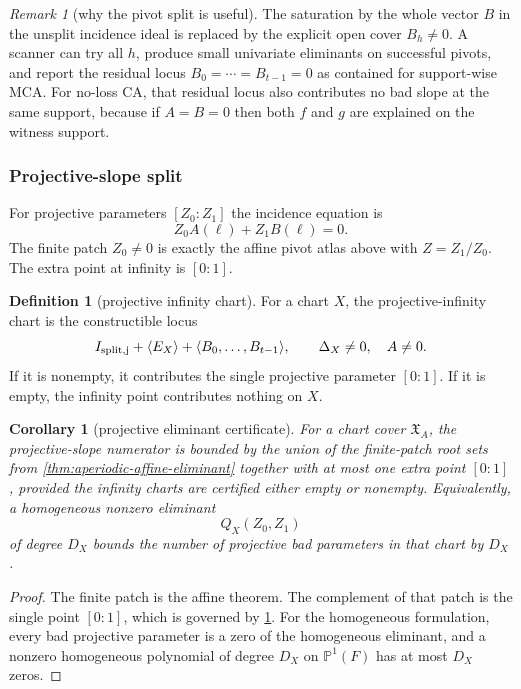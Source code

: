 \documentclass[11pt]{article}
\newtheorem{corollary}[corollary]{Corollary}
\theoremstyle{definition}
\newtheorem{definition}[definition]{Definition}
\theoremstyle{remark}
\newtheorem{remark}[remark]{Remark}
\begin{document}
\begin{remark}[why the pivot split is useful]
\label{rem:pivot-split-useful}
The saturation by the whole vector $B$ in the unsplit incidence ideal is replaced
by the explicit open cover $B_h\ne0$.  A scanner can try all $h$, produce small
univariate eliminants on successful pivots, and report the residual locus
$B_0=\cdots=B_{t-1}=0$ as contained for support-wise MCA.  For no-loss CA, that
residual locus also contributes no bad slope at the same support, because if
$A=B=0$ then both $f$ and $g$ are explained on the witness support.
\end{remark}

\subsubsection{Projective-slope split}

For projective parameters $[Z_0:Z_1]$ the incidence equation is
\[
        Z_0A(\ell)+Z_1B(\ell)=0 .
\]
The finite patch $Z_0\ne0$ is exactly the affine pivot atlas above with
$Z=Z_1/Z_0$.  The extra point at infinity is $[0:1]$.

\begin{definition}[projective infinity chart]
\label{def:projective-infinity-chart}
For a chart $X$, the projective-infinity chart is the constructible locus
\[
        I_{\rm split,j}+\langle E_X\rangle+
        \langle B_0,\ldots,B_{t-1}\rangle,
        \qquad
        \Delta_X\ne0,
        \quad A\ne0 .
\]
If it is nonempty, it contributes the single projective parameter $[0:1]$.
If it is empty, the infinity point contributes nothing on $X$.
\end{definition}

\begin{corollary}[projective eliminant certificate]
\label{cor:projective-eliminant-certificate}
For a chart cover $\mathfrak X_A$, the projective-slope numerator is bounded by
the union of the finite-patch root sets from
\cref{thm:aperiodic-affine-eliminant} together with at most one extra point
$[0:1]$, provided the infinity charts are certified either empty or nonempty.
Equivalently, a homogeneous nonzero eliminant
\[
        Q_X(Z_0,Z_1)
\]
of degree $D_X$ bounds the number of projective bad parameters in that chart by
$D_X$.
\end{corollary}

\begin{proof}
The finite patch is the affine theorem.  The complement of that patch is the
single point $[0:1]$, which is governed by \cref{def:projective-infinity-chart}.
For the homogeneous formulation, every bad projective parameter is a zero of the
homogeneous eliminant, and a nonzero homogeneous polynomial of degree $D_X$ on
$\mathbb P^1(F)$ has at most $D_X$ zeros.
\end{proof}
\end{document}
